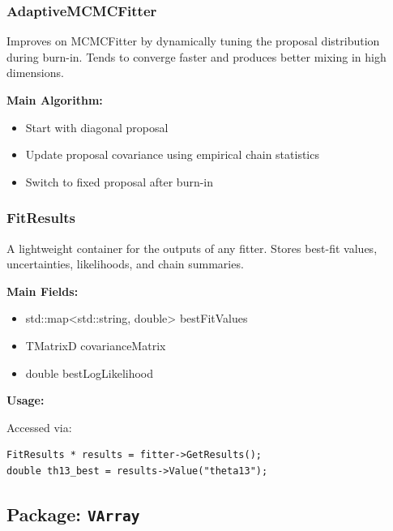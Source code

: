 \vspace{1em}
\subsubsection*{\color{cadmiumgreen}\bf AdaptiveMCMCFitter}

Improves on {\color{cadmiumgreen} MCMCFitter} by dynamically tuning the proposal distribution during burn-in.  
Tends to converge faster and produces better mixing in high dimensions.

\vspace{0.5em}
\noindent\textbf{Main Algorithm:}
\begin{itemize}
  \item Start with diagonal proposal
  \item Update proposal covariance using empirical chain statistics
  \item Switch to fixed proposal after burn-in
\end{itemize}

\vspace{1em}
\subsubsection*{\color{cadmiumgreen}\bf FitResults}

A lightweight container for the outputs of any fitter.  
Stores best-fit values, uncertainties, likelihoods, and chain summaries.

\noindent\textbf{Main Fields:}

\begin{itemize}
  \item {\color{amber}std::map<std::string, double>} bestFitValues
  \item {\color{amber}TMatrixD} covarianceMatrix
  \item {\color{amber}double} bestLogLikelihood
\end{itemize}

\noindent\textbf{Usage:}

Accessed via:

\begin{lstlisting}
FitResults * results = fitter->GetResults();
double th13_best = results->Value("theta13");
\end{lstlisting}



%
%
%

\subsection{Package: \texttt{VArray}}


